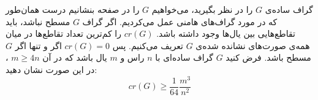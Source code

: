 \EXERCISE
گراف ساده‌ی
$G$
را در نظر بگیرید، می‌خواهیم
$G$
را در صفحه بنشانیم درست همان‌طور که در مورد گراف‌های هامنی عمل می‌کردیم. اگر گراف
$G$
مسطح نباشد، باید تقاطع‌هایی بین یال‌ها وجود داشته باشد.
$cr(G)$
را کم‌ترین تعداد تقاطع‌ها در میان همه‌ی صورت‌های نشانده شده‌ی
$G$
تعریف می‌کنیم. پس
$cr(G) = 0$
اگر و تنها اگر
$G$
مسطح باشد. فرض کنید
$G$
گراف ساده‌ای با
$n$
راس و
$m$
یال باشد که در آن
$m \geq 4n$
، در این صورت نشان دهید:
$$cr(G) \geq \frac{1}{64}\frac{m^3}{n^2}$$

